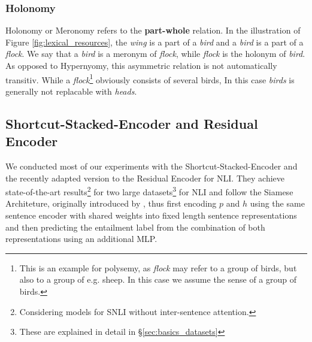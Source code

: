 \subsubsection{Holonomy}
Holonomy or Meronomy refers to the \textbf{part-whole} relation. In the illustration of Figure \ref{fig:lexical_resources}, the \textit{wing} is a part of a \textit{bird} and a \textit{bird} is a part of a \textit{flock}. We say that a \textit{bird} is a meronym of \textit{flock}, while \textit{flock} is the holonym of \textit{bird}. As opposed to Hypernyomy, this asymmetric relation is not automatically transitiv. While a \textit{flock}\footnote{This is an example for polysemy, as \textit{flock} may refer to a group of birds, but also to a group of e.g. sheep. In this case we assume the sense of a group of birds.} obviously consists of several birds, In this case \textit{birds} is generally not replacable with \textit{heads}. 

\subsection{Shortcut-Stacked-Encoder and Residual Encoder}\label{sec:residual_encoder_def}
We conducted most of our experiments with the Shortcut-Stacked-Encoder \citep{nie2017shortcut} and the recently adapted version to the Residual Encoder for \ac{NLI}. They achieve state-of-the-art results\footnote{Considering models for SNLI without inter-sentence attention.} for two large datasets\footnote{These are explained in detail in §\ref{sec:basics_datasets}} for \ac{NLI} and follow the Siamese Architeture, originally introduced by \cite{bromley1994signature}, thus first encoding $p$ and $h$ using the same sentence encoder with shared weights into fixed length sentence representations and then predicting the entailment label from the combination of both representations using an additional \ac{MLP}.

